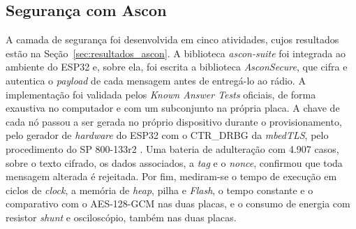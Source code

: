 \subsection{Segurança com Ascon}
A camada de segurança foi desenvolvida em cinco atividades, cujos resultados estão na Seção~\ref{sec:resultados_ascon}. A biblioteca \textit{ascon-suite} foi integrada ao ambiente do ESP32 e, sobre ela, foi escrita a biblioteca \textit{AsconSecure}, que cifra e autentica o \textit{payload} de cada mensagem antes de entregá-lo ao rádio. A implementação foi validada pelos \textit{Known Answer Tests} oficiais, de forma exaustiva no computador e com um subconjunto na própria placa. A chave de cada nó passou a ser gerada no próprio dispositivo durante o provisionamento, pelo gerador de \textit{hardware} do ESP32 com o CTR\_DRBG da \textit{mbedTLS}, pelo procedimento do SP 800-133r2 \cite{barker2020nist133}. Uma bateria de adulteração com 4.907 casos, sobre o texto cifrado, os dados associados, a \textit{tag} e o \textit{nonce}, confirmou que toda mensagem alterada é rejeitada. Por fim, mediram-se o tempo de execução em ciclos de \textit{clock}, a memória de \textit{heap}, pilha e \textit{Flash}, o tempo constante e o comparativo com o AES-128-GCM nas duas placas, e o consumo de energia com resistor \textit{shunt} e osciloscópio, também nas duas placas.

